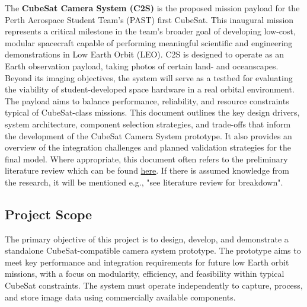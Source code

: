 \documentclass[10pt]{article}
\newcommand{\nl}{\newline \newline}
\begin{document}
The \textbf{CubeSat Camera System (C2S)} is the proposed mission payload for the Perth Aerospace Student Team's (PAST) first CubeSat. This inaugural mission represents a critical milestone in the team's broader goal of developing low-cost, modular spacecraft capable of performing meaningful scientific and engineering demonstrations in Low Earth Orbit (LEO).
C2S is designed to operate as an Earth observation payload, taking photos of certain land- and oceanscapes. Beyond its imaging objectives, the system will serve as a testbed for evaluating the viability of student-developed space hardware in a real orbital environment. The payload aims to balance performance, reliability, and resource constraints typical of CubeSat-class missions.
\nl
This document outlines the key design drivers, system architecture, component selection strategies, and trade-offs that inform the development of the CubeSat Camera System prototype. It also provides an overview of the integration challenges and planned validation strategies for the final model.
\nl
Where appropriate, this document often refers to the preliminary literature review which can be found \href{https://github.com/f3l1xa88077/C2S/blob/main/Lit%20Review/C2S-Literature-Review.pdf}{here}. If there is assumed knowledge from the research, it will be mentioned e.g., "see literature review for breakdown".

\subsection{Project Scope}

The primary objective of this project is to design, develop, and demonstrate a standalone CubeSat-compatible camera system prototype. The prototype aims to meet key performance and integration requirements for future low Earth orbit missions, with a focus on modularity, efficiency, and feasibility within typical CubeSat constraints. The system must operate independently to capture, process, and store image data using commercially available components.
\end{document}

